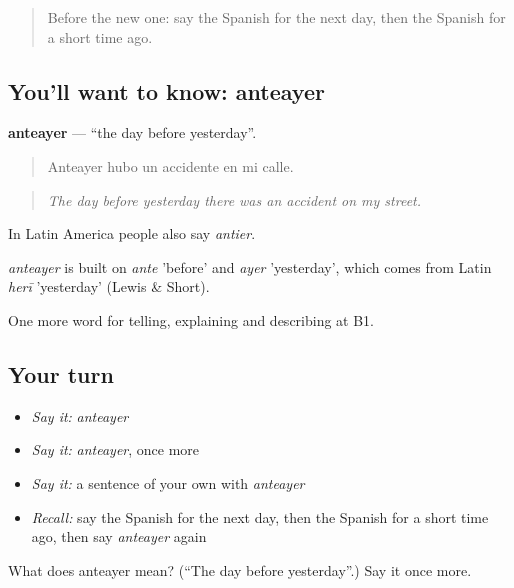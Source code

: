 \label{lesson:ES-C537-anteayer}



\begin{quote}
Before the new one: say the Spanish for the next day, then the Spanish for a short time ago.
\end{quote}

\subsection*{You'll want to know: anteayer}
\textbf{anteayer} — \textquotedblleft{}the day before yesterday\textquotedblright{}.

\begin{quote}
Anteayer hubo un accidente en mi calle.
\end{quote}

\begin{quote}
\emph{The day before yesterday there was an accident on my street.}
\end{quote}

In Latin America people also say \emph{antier}.

\begin{cousinweb}
\emph{anteayer} is built on \emph{ante} 'before' and \emph{ayer} 'yesterday', which comes from Latin \emph{herī} 'yesterday' (Lewis \& Short).
\end{cousinweb}

\begin{grammarlens}[title={What you've built}]
One more word for telling, explaining and describing at B1.
\end{grammarlens}

\subsection*{Your turn}
\begin{itemize}
\raggedright
  \item \emph{Say it:} \emph{anteayer}
  \item \emph{Say it:} \emph{anteayer}, once more
  \item \emph{Say it:} a sentence of your own with \emph{anteayer}
  \item \emph{Recall:} say the Spanish for the next day, then the Spanish for a short time ago, then say \emph{anteayer} again
\end{itemize}

\begin{tcolorbox}[breakable,colback=teal!4,colframe=teal!35!black,title={Before you move on}]
What does anteayer mean? (\textquotedblleft{}The day before yesterday\textquotedblright{}.) Say it once more.
\end{tcolorbox}
